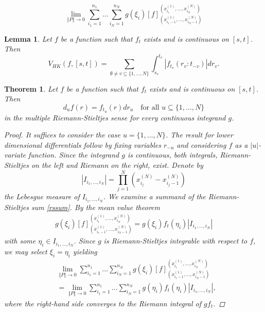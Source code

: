 \documentclass[10pt,a4paper]{amsart}
\newtheorem{lemma}{Lemma}
\newtheorem{theorem}{Theorem}
\begin{document}
\begin{equation}
\label{rssum}
\lim_{\Vert P \Vert\to 0} \sum_{i_1 = 1}^{n_1}\dots\sum_{i_N = 1}^{n_N} g(\xi_i)[f]_{(x^{(1)}_{i_1-1}, \dots, x^{(N)}_{i_N-1})}^{(x^{(1)}_{i_1}, \dots, x^{(N)}_{i_N})}
\end{equation}

\begin{lemma}
\label{lemma:variationofdifferentiable}
Let $f$ be a function such that $f_t$ exists and is continuous on $[s,t]$. Then
\begin{equation*}
V_{HK}(f, [s,t]) = \sum_{\emptyset\neq v\subseteq \{1,\dots,N\}} \int_{s_v}^{t_v} \left|f_{t_v}(r_v:t_{-v})\right| dr_v.
\end{equation*}
\end{lemma}

\begin{theorem}
\label{lemma:radon}
Let $f$ be a function such that $f_t$ exists and is continuous on $[s,t]$. Then
$$d_u f(r) = f_{t_u}(r)dr_u\quad \text{for all } u\subseteq\{1,\dots,N\}$$
in the multiple Riemann-Stieltjes sense for every continuous integrand $g$. 
\begin{proof}
It suffices to consider the case $u = \{1,\dots,N\}$. The result for lower dimensional differentials follow by fixing variables $r_{-u}$ and considering $f$ as a $|u|$-variate function. Since the integrand $g$ is continuous, both integrals, Riemann-Stieltjes on the left and Riemann on the right, exist. Denote by
$$\left|I_{i_1,\dots,i_N}\right| = \prod_{j=1}^N (x_{i_j}^{(N)} -x_{i_j-1}^{(N)}) $$
the Lebesgue measure of $I_{i_1,\dots,i_N}$. We examine a summand of the Riemann-Stieltjes sum \eqref{rssum}. By the mean value theorem
\begin{equation*}
\begin{split}
 g(\xi_i)[f]_{(x^{(1)}_{i_1-1}, \dots, x^{(N)}_{i_N-1})}^{(x^{(1)}_{i_1}, \dots, x^{(N)}_{i_N})} =
 g(\xi_i) f_{t}(\eta_{i})\left|I_{i_1,\dots,i_N}\right|
 \end{split}
\end{equation*}
with some $\eta_{i}\in I_{i_1,\dots,i_N}$. 
Since $g$ is Riemann-Stieltjes integrable with respect to $f$, we may select $\xi_i = \eta_{i}$
yielding
\begin{equation*}
\begin{split}
&\lim_{\Vert P \Vert\to 0} \sum_{i_1 = 1}^{n_1}\dots\sum_{i_N = 1}^{n_N}g(\xi_i)[f]_{(x^{(1)}_{i_1-1}, \dots, x^{(N)}_{i_N-1})}^{(x^{(1)}_{i_1}, \dots, x^{(N)}_{i_N})}\\
&= \lim_{\Vert P \Vert\to 0}\sum_{i_1 = 1}^{n_1}\dots\sum_{i_N = 1}^{n_N} g(\eta_i) f_{t}(\eta_i)\left|I_{i_1,\dots,i_N}\right|,
\end{split}
\end{equation*}
where the right-hand side converges to the Riemann integral of $gf_t$.
\end{proof}
\end{theorem}
\end{document}
